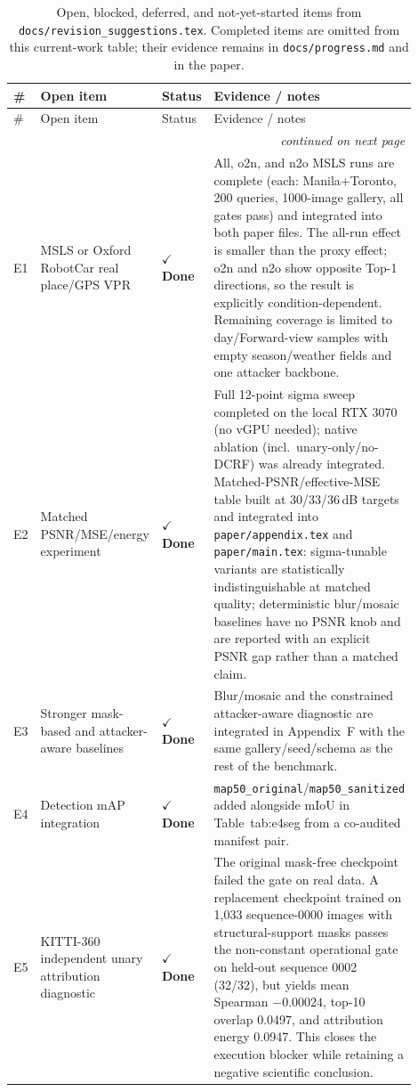\documentclass[11pt]{article}
\newcommand{\done}{\textcolor{DoneGreen}{\textbf{$\checkmark$ Done}}}
\begin{document}
\begin{longtable}{@{}p{0.05\linewidth}p{0.23\linewidth}p{0.14\linewidth}p{0.48\linewidth}@{}}
\caption{Open, blocked, deferred, and not-yet-started items from
\texttt{docs/revision\_suggestions.tex}. Completed items are omitted from this
current-work table; their evidence remains in \texttt{docs/progress.md} and in
the paper.}
\label{tab:completion}\\
\toprule
\# & Open item & Status & Evidence / notes \\
\midrule
\endfirsthead
\toprule
\# & Open item & Status & Evidence / notes \\
\midrule
\endhead
\midrule
\multicolumn{4}{r}{\itshape continued on next page} \\
\endfoot
\bottomrule
\endlastfoot
E1 & MSLS or Oxford RobotCar real place/GPS VPR & \done & All, o2n, and n2o MSLS runs are complete (each: Manila+Toronto, 200 queries, 1000-image gallery, all gates pass) and integrated into both paper files. The all-run effect is smaller than the proxy effect; o2n and n2o show opposite Top-1 directions, so the result is explicitly condition-dependent. Remaining coverage is limited to day/Forward-view samples with empty season/weather fields and one attacker backbone. \\
E2 & Matched PSNR/MSE/energy experiment & \done & Full 12-point sigma sweep completed on the local RTX 3070 (no vGPU needed); native ablation (incl.\ unary-only/no-DCRF) was already integrated. Matched-PSNR/effective-MSE table built at 30/33/36\,dB targets and integrated into \texttt{paper/appendix.tex} and \texttt{paper/main.tex}: sigma-tunable variants are statistically indistinguishable at matched quality; deterministic blur/mosaic baselines have no PSNR knob and are reported with an explicit PSNR gap rather than a matched claim. \\
E3 & Stronger mask-based and attacker-aware baselines & \done & Blur/mosaic and the constrained attacker-aware diagnostic are integrated in Appendix~F with the same gallery/seed/schema as the rest of the benchmark. \\
E4 & Detection mAP integration & \done & \texttt{map50\_original}/\texttt{map50\_sanitized} added alongside mIoU in Table~tab:e4seg from a co-audited manifest pair. \\
E5 & KITTI-360 independent unary attribution diagnostic & \done & The original mask-free checkpoint failed the gate on real data. A replacement checkpoint trained on 1,033 sequence-0000 images with structural-support masks passes the non-constant operational gate on held-out sequence 0002 (32/32), but yields mean Spearman $-0.00024$, top-10 overlap 0.0497, and attribution energy 0.0947. This closes the execution blocker while retaining a negative scientific conclusion. \\

\end{longtable}
\end{document}
